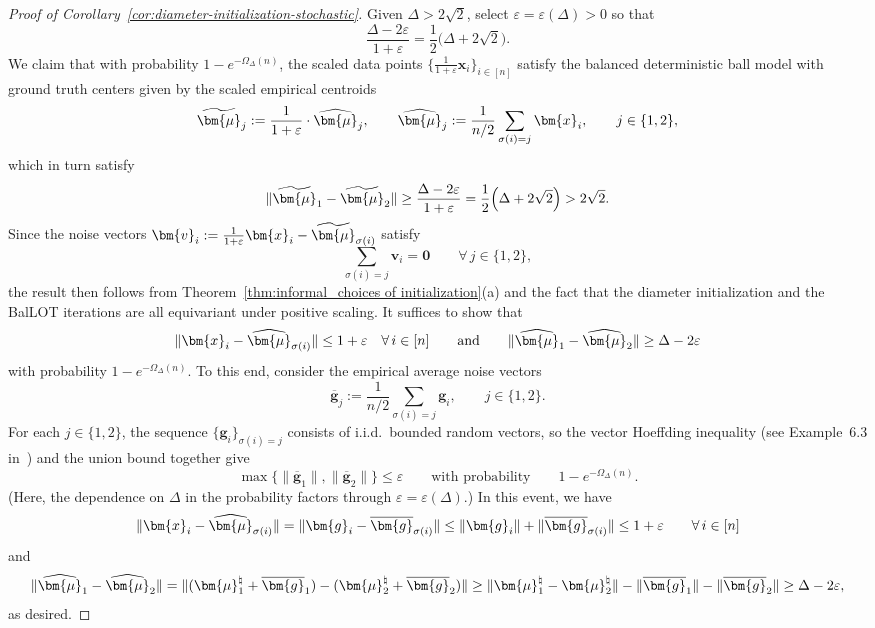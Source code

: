 \documentclass{article}
\theoremstyle{plain}
\theoremstyle{definition}
\newcommand{\1}{\mathbf{1}}
\newcommand{\hmu}{\bm{\mu}^\natural}
\newcommand{\bmu}{\bm{\mu}}
\begin{document}
\begin{proof}[Proof of Corollary~\ref{cor:diameter-initialization-stochastic}]
Given $\Delta>2\sqrt{2}$, select $\varepsilon=\varepsilon(\Delta)>0$ so that
\[
\frac{\Delta-2\varepsilon}{1+\varepsilon}
=\frac{1}{2}\Big(\Delta+2\sqrt{2}\Big).
\]
We claim that with probability $1-e^{-\Omega_\Delta(n)}$, the scaled data points $\{\frac{1}{1+\varepsilon}\bm{x}_i\}_{i\in[n]}$ satisfy the balanced deterministic ball model with ground truth centers given by the scaled empirical centroids
\[
\widetilde\bmu_j
:=\frac{1}{1+\varepsilon}\cdot\widehat\bmu_j,
\qquad
\widehat\bmu_j
:=\frac{1}{n/2}\sum_{\sigma(i)=j}\bm{x}_i,
\qquad
j\in\{1,2\},
\]
which in turn satisfy
\[
\|\widetilde\bmu_1-\widetilde\bmu_2\|
\geq
\frac{\Delta-2\varepsilon}{1+\varepsilon}
=\frac{1}{2}\Big(\Delta+2\sqrt{2}\Big)
>2\sqrt{2}.
\]
Since the noise vectors $\bm{v}_i:=\frac{1}{1+\varepsilon}\bm{x}_i-\widetilde\bmu_{\sigma(i)}$ satisfy
\[
\sum_{\sigma(i)=j}\bm{v}_i
=\bm{0}
\qquad
\forall\,j\in\{1,2\},
\]
the result then follows from Theorem~\ref{thm:informal_choices of initialization}(a) and the fact that the diameter initialization and the BalLOT iterations are all equivariant under positive scaling.
It suffices to show that
\[
\|\bm{x}_i-\widehat\bmu_{\sigma(i)}\|\leq 1+\varepsilon
\quad \forall\,i\in[n]
\qquad\text{and}\qquad
\|\widehat\bmu_1-\widehat\bmu_2\|\geq\Delta-2\varepsilon
\]
with probability $1-e^{-\Omega_\Delta(n)}$.
To this end, consider the empirical average noise vectors
\[
\overline{\bm{g}}_j
:=\frac{1}{n/2}\sum_{\sigma(i)=j}\bm{g}_i,
\qquad
j\in\{1,2\}.
\]
For each $j\in\{1,2\}$, the sequence $\{\bm{g}_i\}_{\sigma(i)=j}$ consists of i.i.d.\ bounded random vectors, so the vector Hoeffding inequality (see Example~6.3 in~\cite{boucheron2013concentration}) and the union bound together give
\[
\max\big\{\|\overline{\bm{g}}_1\|,\|\overline{\bm{g}}_2\|\big\}
\leq\varepsilon
\qquad
\text{with probability}
\qquad
1-e^{-\Omega_\Delta(n)}.
\]
(Here, the dependence on $\Delta$ in the probability factors through $\varepsilon=\varepsilon(\Delta)$.)
In this event, we have
\[
\|\bm{x}_i-\widehat\bmu_{\sigma(i)}\|
=\|\bm{g}_i-\overline{\bm{g}}_{\sigma(i)}\|
\leq\|\bm{g}_i\|+\|\overline{\bm{g}}_{\sigma(i)}\|
\leq 1+\varepsilon
\qquad
\forall\,i\in[n]
\]
and
\[
\|\widehat\bmu_1-\widehat\bmu_2\|
=\|(\hmu_1+\overline{\bm{g}}_{1})-(\hmu_2+\overline{\bm{g}}_{2})\|
\geq\|\hmu_1-\hmu_2\|-\|\overline{\bm{g}}_{1}\|-\|\overline{\bm{g}}_{2}\|
\geq\Delta-2\varepsilon,
\]
as desired.
\end{proof}
\end{document}
